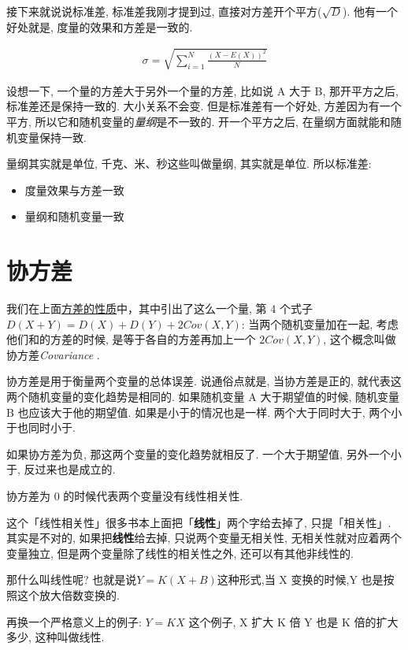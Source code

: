 接下来就说说标准差, 标准差我刚才提到过, 直接对方差开个平方($\sqrt{D}$). 他有一个好处就是, 度量的效果和方差是一致的. 

\begin{align*}
  \sigma  = \sqrt{\sum^N_{i=1}\frac{(X-E(X))^2}{N}}
\end{align*}

设想一下, 一个量的方差大于另外一个量的方差, 比如说 A 大于 B, 那开平方之后, 标准差还是保持一致的. 大小关系不会变. 但是标准差有一个好处, 方差因为有一个平方, 所以它和随机变量的\textit{量纲}是不一致的. 开一个平方之后, 在量纲方面就能和随机变量保持一致. 

量纲其实就是单位, 千克、米、秒这些叫做量纲, 其实就是单位. 所以标准差:

\begin{itemize}
  \item 度量效果与方差一致
  \item 量纲和随机变量一致
\end{itemize}

\hypertarget{协方差}{}
\section{协方差}

我们在上面\hyperlink{方差的性质}{方差的性质}中，其中引出了这么一个量, 第 4 个式子 $D(X+Y) = D(X) + D(Y) + 2Cov(X,Y)$: 当两个随机变量加在一起, 考虑他们和的方差的时候, 是等于各自的方差再加上一个 $2Cov(X,Y)$, 这个概念叫做协方差\textit{Covariance} . 

协方差是用于衡量两个变量的总体误差. 说通俗点就是, 当协方差是正的, 就代表这两个随机变量的变化趋势是相同的. 如果随机变量 A 大于期望值的时候, 随机变量 B 也应该大于他的期望值. 如果是小于的情况也是一样. 两个大于同时大于, 两个小于也同时小于. 

如果协方差为负, 那这两个变量的变化趋势就相反了. 一个大于期望值, 另外一个小于, 反过来也是成立的. 

协方差为 0 的时候代表两个变量没有线性相关性. 

这个「线性相关性」很多书本上面把「\textbf{线性}」两个字给去掉了, 只提「相关性」. 其实是不对的, 如果把\textbf{线性}给去掉, 只说两个变量无相关性, 无相关性就对应着两个变量独立, 但是两个变量除了线性的相关性之外, 还可以有其他非线性的. 

那什么叫线性呢? 也就是说$Y=K(X+B)$这种形式,当 X 变换的时候,Y 也是按照这个放大倍数变换的. 

再换一个严格意义上的例子: $Y=KX$ 这个例子, X 扩大 K 倍 Y 也是 K 倍的扩大多少, 这种叫做线性. 

